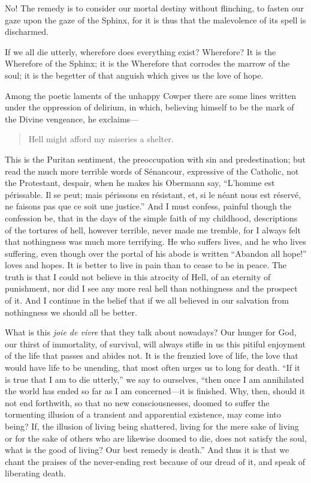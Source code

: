 No! The remedy is to consider our mortal destiny without flinching, to
fasten our gaze upon the gaze of the Sphinx, for it is thus that the
malevolence of its spell is discharmed.

If we all die utterly, wherefore does everything exist? Wherefore? It
is the Wherefore of the Sphinx; it is the Wherefore that corrodes the
marrow of the soul; it is the begetter of that anguish which gives us
the love of hope.

Among the poetic laments of the unhappy Cowper there are some lines
written under the oppression of delirium, in which, believing himself
to be the mark of the Divine vengeance, he exclaims---

\begin{quote}{Hell might afford my miseries a shelter.}
\end{quote}

\noindent This is the Puritan sentiment, the preoccupation with sin
and predestination; but read the much more terrible words of
S\'enancour, expressive of the Catholic, not the Protestant, despair,
when he makes his Obermann say, ``L'homme est p\'erissable. Il se
peut; mais p\'erissons en r\'esistant, et, si le n\'eant nous est
r\'eserv\'e, ne faisons pas que ce soit une justice.'' And I must
confess, painful though the confession be, that in the days of the
simple faith of my childhood, descriptions of the tortures of hell,
however terrible, never made me tremble, for I always felt that
nothingness was much more terrifying. He who suffers lives, and he who
lives suffering, even though over the portal of his abode is written
``Abandon all hope!'' loves and hopes. It is better to live in pain
 than to cease to be in peace. The truth is that I could not
believe in this atrocity of Hell, of an eternity of punishment, nor
did I see any more real hell than nothingness and the prospect of it.
And I continue in the belief that if we all believed in our salvation
from nothingness we should all be better.

What is this \textit{joie de vivre} that they talk about nowadays? Our
hunger for God, our thirst of immortality, of survival, will always
stifle in us this pitiful enjoyment of the life that passes and abides
not. It is the frenzied love of life, the love that would have life to
be unending, that most often urges us to long for death. ``If it is
true that I am to die utterly,'' we say to ourselves, ``then once I am
annihilated the world has ended so far as I am con\-cerned---it is
finished. Why, then, should it not end forthwith, so that no new
consciousnesses, doomed to suffer the tormenting illusion of a
transient and apparential existence, may come into being? If, the
illusion of living being shattered, living for the mere sake of living
or for the sake of others who are likewise doomed to die, does not
satisfy the soul, what is the good of living? Our best remedy is
death.'' And thus it is that we chant the praises of the never-ending
rest because of our dread of it, and speak of liberating death.

